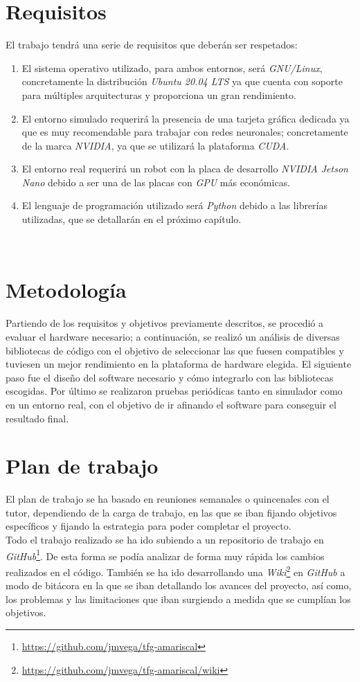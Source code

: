 \section{Requisitos}
\label{sec:requisitos}
El trabajo tendrá una serie de requisitos que deberán ser respetados:
\begin{enumerate}
	\item El sistema operativo utilizado, para ambos entornos, será \textit{GNU/Linux}, concretamente la distribución \textit{Ubuntu 20.04 LTS} ya que cuenta con soporte para múltiples arquitecturas y proporciona un gran rendimiento.
	\item El entorno simulado requerirá la presencia de una tarjeta gráfica dedicada ya que es muy recomendable para trabajar con redes neuronales; concretamente de la marca \textit{NVIDIA}, ya que se utilizará la plataforma \textit{CUDA}.
	\item El entorno real requerirá un robot con la placa de desarrollo \textit{NVIDIA Jetson Nano} debido a ser una de las placas con \textit{GPU} más económicas.
	\item El lenguaje de programación utilizado será \textit{Python} debido a las librerías utilizadas, que se detallarán en el próximo capítulo.
\end{enumerate}\

\section{Metodología}
\label{sec:metodologia}
Partiendo de los requisitos y objetivos previamente descritos, se procedió a evaluar el hardware necesario; a continuación, se realizó un análisis de diversas bibliotecas de código con el objetivo de seleccionar las que fuesen compatibles y tuviesen un mejor rendimiento en la plataforma de hardware elegida. El siguiente paso fue el diseño del software necesario y cómo integrarlo con las bibliotecas escogidas. Por último se realizaron pruebas periódicas tanto en simulador como en un entorno real, con el objetivo de ir afinando el software para conseguir el resultado final.\\

\section{Plan de trabajo}
\label{sec:plantrabajo}

El plan de trabajo se ha basado en reuniones semanales o quincenales con el tutor, dependiendo de la carga de trabajo, en las que se iban fijando objetivos específicos y fijando la estrategia para poder completar el proyecto.\\

Todo el trabajo realizado se ha ido subiendo a un repositorio de trabajo en \textit{GitHub}\footnote{\url{https://github.com/jmvega/tfg-amariscal}}. De esta forma se podía analizar de forma muy rápida los cambios realizados en el código. También se ha ido desarrollando una \textit{Wiki}\footnote{\url{https://github.com/jmvega/tfg-amariscal/wiki}} en \textit{GitHub} a modo de bitácora en la que se iban detallando los avances del proyecto, así como, los problemas y las limitaciones que iban surgiendo a medida que se cumplían los objetivos.\\
